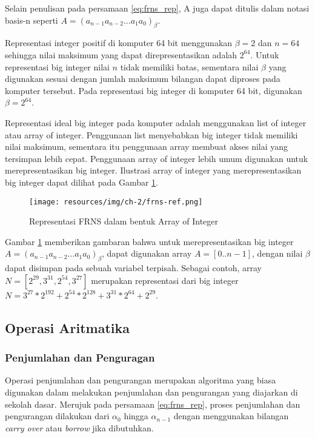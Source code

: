       Selain penulisan pada persamaan \ref{eq:frns_rep}, A juga dapat ditulis dalam notasi basis-n seperti $A = (a_{n-1} a_{n-2} ... a_{1} a_{0})_\beta$.

      Representasi integer positif di komputer 64 bit menggunakan $\beta = 2$ dan $n = 64$ sehingga nilai maksimum yang dapat direpresentasikan adalah $2^{64}$. Untuk representasi big integer nilai $n$ tidak memiliki batas, sementara nilai $\beta$ yang digunakan sesuai dengan jumlah maksimum bilangan dapat diproses pada komputer tersebut. Pada representasi big integer di komputer 64 bit, digunakan $\beta = 2^{64}$.

      Representasi ideal big integer pada komputer adalah menggunakan list of integer atau array of integer. Penggunaan list menyebabkan big integer tidak memiliki nilai maksimum, sementara itu penggunaan array membuat akses nilai yang tersimpan lebih cepat. Penggunaan array of integer lebih umum digunakan untuk merepresentasikan big integer. Ilustrasi array of integer yang merepresentasikan big integer dapat dilihat pada Gambar \ref{fig:frns_ref}.

      \begin{figure}[h]
        \centering
        \texttt{[image: resources/img/ch-2/frns-ref.png]}
        \caption{Representasi FRNS dalam bentuk Array of Integer}
        \label{fig:frns_ref}
      \end{figure}

      Gambar \ref{fig:frns_ref} memberikan gambaran bahwa untuk merepresentasikan big integer $A = (a_{n-1} a_{n-2} ... a_{1} a_{0})_\beta$, dapat digunakan array $A = [0..n-1]$, dengan nilai $\beta$ dapat disimpan pada sebuah variabel terpisah. Sebagai contoh, array $N = [2^{29}, 3^{31}, 2^{54}, 3^{27}]$ merupakan representasi dari big integer $N = 3^{27}*2^{192} + 2^{54}*2^{128} + 3^{31}*2^{64} + 2^{29}$.

  \subsection{Operasi Aritmatika}

    \subsubsection{Penjumlahan dan Penguragan} \label{sec:add_sub_theory}

      Operasi penjumlahan dan pengurangan merupakan algoritma yang biasa digunakan dalam melakukan penjumlahan dan pengurangan yang diajarkan di sekolah dasar. Merujuk pada persamaan \ref{eq:frns_rep}, proses penjumlahan dan pengurangan dilakukan dari $\alpha_0$ hingga $\alpha_{n-1}$ dengan menggunakan bilangan \textit{carry over} atau \textit{borrow} jika dibutuhkan.

